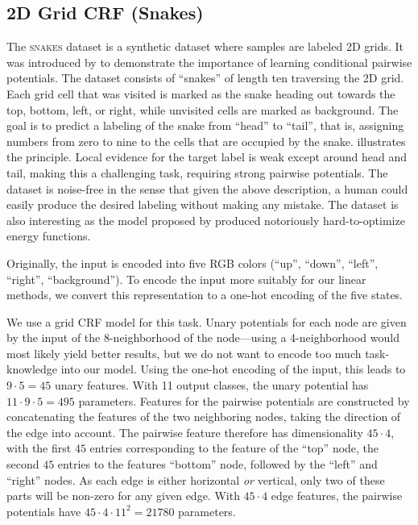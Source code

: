 \subsection{2D Grid CRF (Snakes)}
The \textsc{snakes} dataset is a synthetic dataset where samples are labeled 2D grids.
It was introduced by \citet{nowozin2011decision} to demonstrate the importance
of learning conditional pairwise potentials. The dataset consists of ``snakes''
of length ten traversing the 2D grid. Each grid cell that was visited is marked
as the snake heading out towards the top, bottom, left, or right, while
unvisited cells are marked as background.  The goal is to predict a labeling of
the snake from ``head'' to ``tail'', that is, assigning numbers from zero to
nine to the cells that are occupied by the snake.  
illustrates the principle.
Local evidence for the target label is weak except
around head and tail, making this a challenging task, requiring strong pairwise
potentials. The dataset is noise-free in the sense that given the above
description, a human could easily produce the desired labeling without making
any mistake. The dataset is also interesting as the model proposed by
\citet{nowozin2011decision} produced notoriously hard-to-optimize energy
functions.

Originally, the input is encoded into five RGB colors
(``up'', ``down'', ``left'', ``right'', ``background'').  To encode the input
more suitably for our linear methods, we convert this representation to a
one-hot encoding of the five states.

We use a grid CRF model for this task. Unary potentials for each node are given by the
input of the 8-neighborhood of the node---using a 4-neighborhood would most
likely yield better results, but we do not want to encode too much
task-knowledge into our model.
Using the one-hot encoding of the input, this leads to $9 \cdot 5 = 45$ unary features.
With 11 output classes, the unary potential has $11 \cdot 9 \cdot 5=495$ parameters.
Features for the pairwise potentials are constructed by concatenating the features
of the two neighboring nodes, taking the direction of the edge into account.
The pairwise feature therefore has dimensionality $45 \cdot 4$, with the first
$45$ entries corresponding to the feature of the ``top'' node, the second $45$
entries to the features ``bottom'' node, followed by the ``left'' and
``right'' nodes. As each edge is either horizontal \emph{or} vertical, only two
of these parts will be non-zero for any given edge.  With $45 \cdot 4$ edge
features, the pairwise potentials have $45 \cdot 4 \cdot 11^2 =21780$ parameters.


